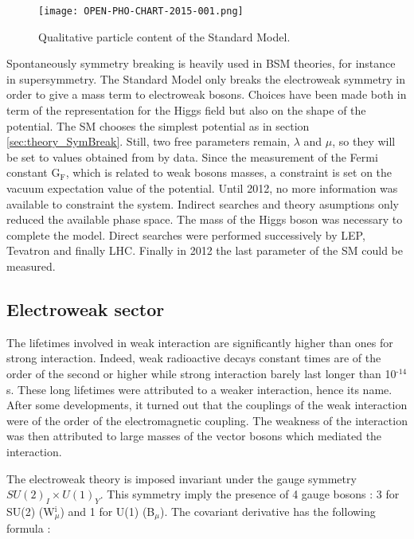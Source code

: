 \begin{figure}[htbp]
\centering
\texttt{[image: OPEN-PHO-CHART-2015-001.png]}
\caption{\label{fig:org1db6618}
Qualitative particle content of the Standard Model. \cite{OPEN-PHO-CHART-2015-001}}
\end{figure}

Spontaneously symmetry breaking is heavily used in BSM theories, for instance in supersymmetry.
The Standard Model only breaks the electroweak symmetry in order to give a mass term to electroweak bosons.
Choices have been made both in term of the representation for the Higgs field but also on the shape of the potential.
The SM chooses the simplest potential as in section \ref{sec:theory_SymBreak}.
Still, two free parameters remain, \(\lambda\) and \(\mu\), so they will be set to values obtained from by data.
Since the measurement of the Fermi constant G\(_{\text{F}}\), which is related to weak bosons masses, a constraint is set on the vacuum expectation value of the potential.
Until 2012, no more information was available to constraint the system.
Indirect searches and theory asumptions only reduced the available phase space.
The mass of the Higgs boson was necessary to complete the model.
Direct searches were performed successively by LEP, Tevatron and finally LHC.
Finally in 2012 the last parameter of the SM could be measured.

\subsection{Electroweak sector}
\label{sec:orga4e442f}

The lifetimes involved in weak interaction are significantly higher than ones for strong interaction.
Indeed, weak radioactive decays constant times are of the order of the second or higher while strong interaction barely last longer than 10\(^{\text{-14}}\)s.
These long lifetimes were attributed to a weaker interaction, hence its name.
After some developments, it turned out that the couplings of the weak interaction were of the order of the electromagnetic coupling.
The weakness of the interaction was then attributed to large masses of the vector bosons which mediated the interaction.

The electroweak theory is imposed invariant under the gauge symmetry \(SU(2)_I\times U(1)_Y\).
This symmetry imply the presence of 4 gauge bosons : 3 for SU(2) (W\(^{\text{i}}_{\mu}\)) and 1 for U(1) (B\(_{\mu}\)).
The covariant derivative has the following formula :

